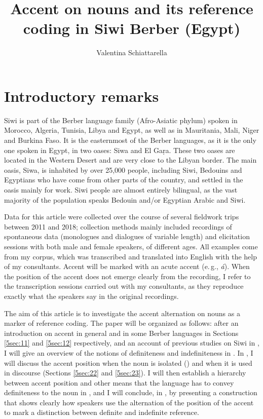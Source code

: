 \documentclass[output=paper]{langsci/langscibook}
\author{Valentina Schiattarella\affiliation{University of Naples, L'Orientale}}
\title{Accent on nouns and its reference coding in Siwi Berber (Egypt)}
\begin{document}
\maketitle


\section{Introductory remarks}\label{5sec:1}

Siwi is part of the Berber language family (Afro-Asiatic phylum) spoken in Morocco, Algeria, Tunisia, Libya and Egypt, as well as in Mauritania, Mali, Niger and Burkina Faso. It is the easternmost of the Berber languages, as it is the only one spoken in Egypt, in two oases: Siwa and El Gaṛa. These two oases are located in the Western Desert and are very close to the Libyan border. The main oasis, Siwa, is inhabited by over 25,000 people, including Siwi, Bedouins and Egyptians who have come from other parts of the country, and settled in the oasis mainly for work. Siwi people are almost entirely bilingual, as the vast majority of the population speaks Bedouin and/or Egyptian Arabic and Siwi. 

Data for this article were collected over the course of several fieldwork trips between 2011 and 2018; collection methods mainly included recordings of spontaneous data (monologues and dialogues of variable length) and elicitation sessions with both male and female speakers, of different ages. All examples come from my corpus, which was transcribed and translated into English with the help of my consultants. Accent will be marked with an acute accent (e.\,g., {\emph{á}}). When the position of the accent does not emerge clearly from the recording, I refer to the transcription sessions carried out with my consultants, as they reproduce exactly what the speakers say in the original recordings.

The aim of this article is to investigate the accent alternation on nouns as a marker of reference coding. The paper will be organized as follows: after an introduction on accent in general and in some Berber languages in Sections \ref{5sec:11} and \ref{5sec:12} respectively, and an account of previous studies on Siwi in , I will give an overview of the notions of definiteness and indefiniteness in . In , I will discuss the accent position when the noun is isolated () and when it is used in discourse (Sections \ref{5sec:22} and \ref{5sec:23}). I will then establish a hierarchy between accent position and other means that the language has to convey definiteness to the noun in , and I will conclude, in , by presenting a construction that shows clearly how speakers use the alternation of the position of the accent to mark a distinction between definite and indefinite reference.
\end{document}
